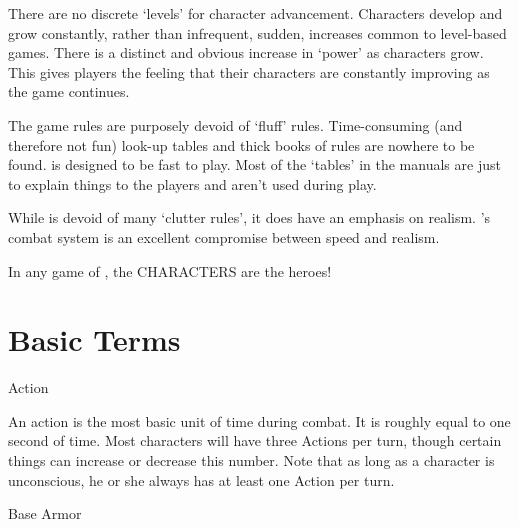 \documentclass[twoside]{book}
\begin{document}
              
              
                 There are no discrete `levels' for
                 character advancement. Characters develop and grow
                 constantly, rather than infrequent, sudden, increases
                 common to level-based games. There is a distinct and
                 obvious increase in `power' as characters
                 grow. This gives players the feeling that their
                 characters are constantly improving as the game
                 continues. 
              
              
                The game rules are purposely devoid of
                `fluff' rules. Time-consuming (and therefore
                not fun) look-up tables and thick books of rules are
                nowhere to be found. \APATHY{}  is designed to be fast
                to play. Most of the `tables' in the \APATHY{}  manuals are just to explain things to the players and
                aren't used during play.
                
              
              
                While \APATHY{}  is devoid of many `clutter
                rules', it does have an emphasis on realism.
                \APATHY{}'s combat system is an excellent
                compromise between speed and realism.
                
              
           In any game of \APATHY{}, the CHARACTERS are the
            heroes!
          
\section{Basic Terms}
      
              
              
                 Action 
                
                 An action is the most basic unit of time during
                 combat. It is roughly equal to one second of time. Most
                 characters will have three Actions per turn, though
                 certain things can increase or decrease this number.
                 Note that as long as a character is unconscious, he or
                 she always has at least one Action per turn. 
              
              
              
                 Base Armor 
                
\end{document}
